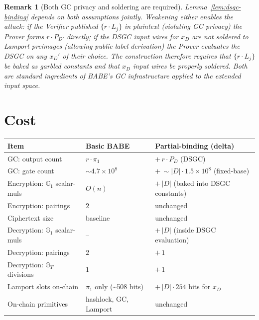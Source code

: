 \documentclass[11pt]{article}
\newtheorem{remark}{Remark}
\newcommand{\Gone}{\mathbb{G}_1}
\newcommand{\Gt}{\mathbb{G}_T}
\begin{document}
\begin{remark}[Both GC privacy and soldering are required]
Lemma~\ref{lem:dsgc-binding} depends on \emph{both} assumptions
jointly. Weakening either enables the attack: if the Verifier
published $\{r \cdot L_j\}$ in plaintext (violating GC privacy) the
Prover forms $r \cdot P_{D'}$ directly; if the DSGC input wires for
$x_D$ are not soldered to Lamport preimages (allowing public label
derivation) the Prover evaluates the DSGC on any $x_D'$ of their
choice. The construction therefore requires that $\{r \cdot L_j\}$
be baked as garbled constants \emph{and} that $x_D$ input wires be
properly soldered. Both are standard ingredients of BABE's GC
infrastructure applied to the extended input space.
\end{remark}

\section{Cost}\label{sec:cost}

\begin{center}
\small
\renewcommand{\arraystretch}{1.2}
\begin{tabular}{@{}l l l@{}}
\toprule
\textbf{Item} & \textbf{Basic BABE} & \textbf{Partial-binding (delta)} \\
\midrule
GC: output count                        & $r \cdot \pi_1$             & $+\,r \cdot P_D$ (DSGC) \\
GC: gate count                          & $\sim 4.7 \times 10^8$      & $+\,\sim |D| \cdot 1.5 \times 10^8$ (fixed-base) \\
Encryption: $\Gone$ scalar-muls         & $O(n)$                      & $+\,|D|$ (baked into DSGC constants) \\
Encryption: pairings                    & $2$                         & unchanged \\
Ciphertext size                         & baseline                    & unchanged \\
Decryption: $\Gone$ scalar-muls         & --                          & $+\,|D|$ (inside DSGC evaluation) \\
Decryption: pairings                    & $2$                         & $+\,1$ \\
Decryption: $\Gt$ divisions             & $1$                         & $+\,1$ \\
Lamport slots on-chain                  & $\pi_1$ only (\textasciitilde 508 bits) & $+\,|D| \cdot 254$ bits for $x_D$ \\
On-chain primitives                     & hashlock, GC, Lamport       & unchanged \\
\bottomrule
\end{tabular}
\end{center}
\end{document}
